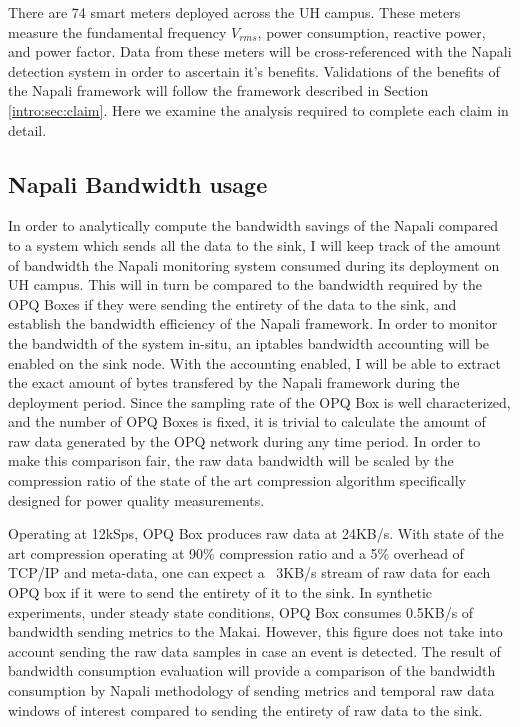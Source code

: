 There are 74 smart meters deployed across the UH campus. These meters measure the fundamental frequency $V_{rms}$, power consumption, reactive power, and power factor. Data from these meters will be cross-referenced with the Napali detection system in order to ascertain it's benefits. Validations of the benefits of the Napali framework will follow the framework described in Section \ref{intro:sec:claim}. Here we examine the analysis required to complete each claim in detail.

\subsection{Napali Bandwidth usage} \label{iexp:sec:band}
In order to analytically compute the bandwidth savings of the Napali compared to a system which sends all the data to the sink, I will keep track of the amount of bandwidth the Napali monitoring system consumed during its deployment on UH campus. This will in turn be compared to the bandwidth required by the OPQ Boxes if they were sending the entirety of the data to the sink, and establish the bandwidth efficiency of the Napali framework. In order to monitor the bandwidth of the system in-situ, an iptables bandwidth accounting will be enabled on the sink node. With the accounting enabled, I will be able to extract the exact amount of bytes transfered by the Napali framework during the deployment period. Since the sampling rate of the OPQ Box is well characterized, and the number of OPQ Boxes is fixed, it is trivial to calculate the amount of raw data generated by the OPQ network during any time period. In order to make this comparison fair, the raw data bandwidth will be scaled by the compression ratio of the state of the art compression algorithm specifically designed for power quality measurements.\cite{zhang2009new}

Operating at 12kSps, OPQ Box produces raw data at 24KB/s. With state of the art compression operating at 90\% compression ratio and a 5\% overhead of TCP/IP and meta-data, one can expect a ~3KB/s stream of raw data for each OPQ box if it were to send the entirety of it to the sink. In synthetic experiments, under steady state conditions, OPQ Box consumes 0.5KB/s of bandwidth sending metrics to the Makai. However, this figure does not take into account sending the raw data samples in case an event is detected. The result of bandwidth consumption evaluation will provide a comparison of the bandwidth consumption by Napali methodology of sending metrics and temporal raw data windows of interest compared to sending the entirety of raw data to the sink.


